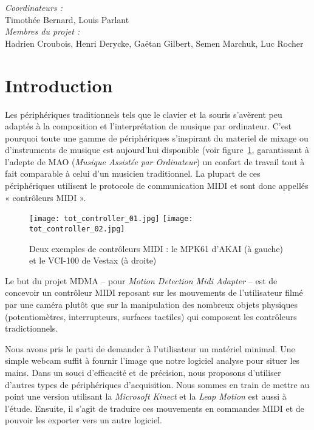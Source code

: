 
\usepackage{pdfpages}


\begin{center}
    \emph{Coordinateurs :}\\
    Timothée Bernard, Louis Parlant\bigskip\\
    \emph{Membres du projet :}\\
    Hadrien Croubois, Henri Derycke, Gaëtan Gilbert, Semen Marchuk, Luc Rocher
\end{center}
\newpage
\tableofcontents
\newpage
\section{Introduction}
\par Les périphériques traditionnels tels que le clavier et la souris s'avèrent peu adaptés à la composition et l'interprétation de musique par ordinateur. C'est pourquoi toute une gamme de périphériques s'inspirant du materiel de mixage ou d'instruments de musique est aujourd'hui disponible (voir figure~\ref{MIDI_controllers}, garantissant à l'adepte de MAO (\emph{Musique Assistée par Ordinateur}) un confort de travail tout à fait comparable à celui d'un musicien traditionnel. La plupart de ces périphériques utilisent le protocole de communication MIDI et sont donc appellés « contrôleurs MIDI ».
\begin{figure}[h]
    \centering
    \texttt{[image: tot\_controller\_01.jpg]}
    \texttt{[image: tot\_controller\_02.jpg]}
    \caption{Deux exemples de contrôleurs MIDI : le MPK61 d'AKAI (à gauche) et le VCI-100 de Vestax (à droite)}
    \label{MIDI_controllers}
\end{figure}
\par Le but du projet MDMA  – pour \emph{Motion Detection Midi Adapter}  – est de concevoir un contrôleur MIDI reposant sur les mouvements de l'utilisateur filmé par une caméra plutôt que sur la manipulation des nombreux objets physiques (potentiomètres, interrupteurs, surfaces tactiles) qui composent les contrôleurs tradictionnels.
\par Nous avons pris le parti de demander à l'utilisateur un matériel minimal. Une simple webcam suffit à fournir l'image que notre logiciel analyse pour situer les mains. Dans un souci d'efficacité et de précision, nous proposons d'utiliser d'autres types de périphériques d'acquisition. Nous sommes en train de mettre au point une version utilisant la \emph{Microsoft Kinect} et la \emph{Leap Motion} est aussi à l'étude. Ensuite, il s'agit de traduire ces mouvements en commandes MIDI et de pouvoir les exporter vers un autre logiciel.
